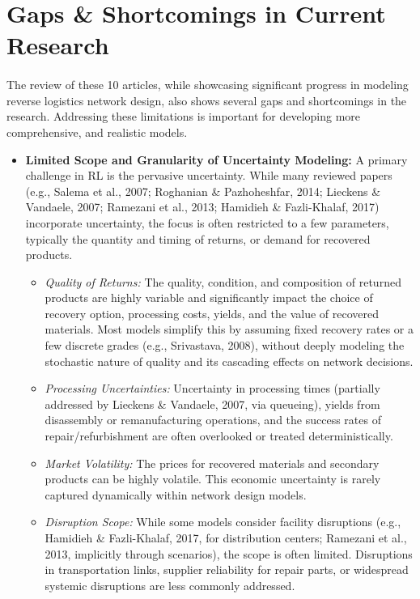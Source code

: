 \section{Gaps \& Shortcomings in Current Research}

\paragraph{} The review of these 10 articles, while showcasing significant progress in modeling reverse logistics network design, also shows several gaps and shortcomings in the research. Addressing these limitations is important for developing more comprehensive, and realistic models.

\begin{itemize}
    \item \textbf{Limited Scope and Granularity of Uncertainty Modeling:}
        A primary challenge in RL is the pervasive uncertainty. While many reviewed papers (e.g., Salema et al., 2007; Roghanian \& Pazhoheshfar, 2014; Lieckens \& Vandaele, 2007; Ramezani et al., 2013; Hamidieh \& Fazli-Khalaf, 2017) incorporate uncertainty, the focus is often restricted to a few parameters, typically the quantity and timing of returns, or demand for recovered products.
        \begin{itemize}
            \item \textit{Quality of Returns:} The quality, condition, and composition of returned products are highly variable and significantly impact the choice of recovery option, processing costs, yields, and the value of recovered materials. Most models simplify this by assuming fixed recovery rates or a few discrete grades (e.g., Srivastava, 2008), without deeply modeling the stochastic nature of quality and its cascading effects on network decisions.
            \item \textit{Processing Uncertainties:} Uncertainty in processing times (partially addressed by Lieckens \& Vandaele, 2007, via queueing), yields from disassembly or remanufacturing operations, and the success rates of repair/refurbishment are often overlooked or treated deterministically.
            \item \textit{Market Volatility:} The prices for recovered materials and secondary products can be highly volatile. This economic uncertainty is rarely captured dynamically within network design models.
            \item \textit{Disruption Scope:} While some models consider facility disruptions (e.g., Hamidieh \& Fazli-Khalaf, 2017, for distribution centers; Ramezani et al., 2013, implicitly through scenarios), the scope is often limited. Disruptions in transportation links, supplier reliability for repair parts, or widespread systemic disruptions are less commonly addressed.
        \end{itemize}


\end{itemize}
